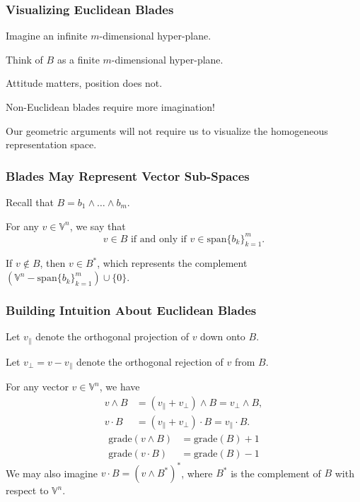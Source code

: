 \documentclass{beamer}
\newcommand{\V}{\mathbb{V}}
\newcommand{\grade}{\mbox{grade}}
\begin{document}
\begin{frame}
\frametitle{Visualizing Euclidean Blades}
Imagine an \alert{infinite} $m$-dimensional hyper-plane.\pause

Think of $B$ as a \alert{finite} $m$-dimensional hyper-plane.\pause

\alert{Attitude} matters, \alert{position} does not.\pause

\alert{Non-Euclidean} blades require more imagination!\pause

Our geometric arguments will not require us to visualize the homogeneous representation space.
\end{frame}

\begin{frame}
\frametitle{Blades May Represent Vector Sub-Spaces}
Recall that $B = b_1\wedge\dots\wedge b_m$.\pause
\begin{definition}
For any $v\in\V^n$, we say that
\begin{equation*}
\mbox{$v\in B$ if and only if $v\in\mbox{span}\{b_k\}_{k=1}^m$}.
\end{equation*}
\end{definition}\pause
\begin{definition}
If $v\not\in B$, then $v\in B^*$, which represents the complement $(\V^n-\mbox{span}\{b_k\}_{k=1}^m)\cup\{0\}$.
\end{definition}
\end{frame}

\begin{frame}
\frametitle{Building Intuition About Euclidean Blades}
Let $v_{\parallel}$ denote the orthogonal \alert{projection} of $v$ down onto $B$.\pause

Let $v_{\perp}=v-v_{\parallel}$ denote the orthogonal \alert{rejection} of $v$ from $B$.\pause

For any vector $v\in\V^n$, we have
\begin{align*}
v\wedge B &= (v_{\parallel} + v_{\perp})\wedge B = v_{\perp}\wedge B, \\
v\cdot B &= (v_{\parallel} + v_{\perp})\cdot B = v_{\parallel}\cdot B.
\end{align*}\pause
\begin{align*}
\grade(v\wedge B) &= \grade(B) + 1 \\
\grade(v\cdot B) &= \grade(B) - 1
\end{align*}\pause
We may also imagine $v\cdot B=(v\wedge B^*)^*$, where $B^*$ is the \alert{complement}
of $B$ with respect to $\V^n$.
\end{frame}
\end{document}

